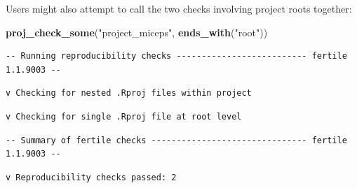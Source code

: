 \documentclass[12pt,twoside]{reedthesis}
\newenvironment{Shaded}{\begin{snugshade}}{\end{snugshade}}
\newcommand{\KeywordTok}[1]{\textcolor[rgb]{0.13,0.29,0.53}{\textbf{#1}}}
\newcommand{\NormalTok}[1]{#1}
\newcommand{\StringTok}[1]{\textcolor[rgb]{0.31,0.60,0.02}{#1}}
\begin{document}
Users might also attempt to call the two checks involving project roots together:
\begin{Shaded}
\begin{Highlighting}[]
\KeywordTok{proj_check_some}\NormalTok{(}\StringTok{"project_miceps"}\NormalTok{, }\KeywordTok{ends_with}\NormalTok{(}\StringTok{"root"}\NormalTok{))}
\end{Highlighting}
\end{Shaded}
\footnotesize
\begin{verbatim}
-- Running reproducibility checks -------------------------- fertile 1.1.9003 --
\end{verbatim}
\begin{verbatim}
v Checking for nested .Rproj files within project
\end{verbatim}
\begin{verbatim}
v Checking for single .Rproj file at root level
\end{verbatim}
\begin{verbatim}
-- Summary of fertile checks ------------------------------- fertile 1.1.9003 --
\end{verbatim}
\begin{verbatim}
v Reproducibility checks passed: 2
\end{verbatim}
\normalsize
\end{document}

